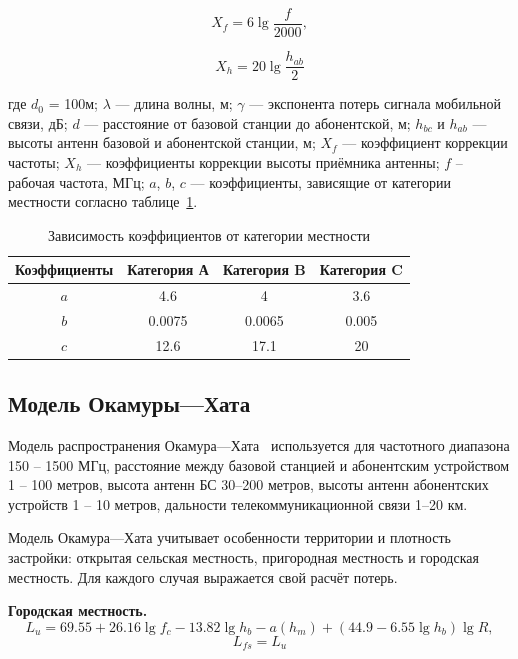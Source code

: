 \begin{equation}
	X_f = 6\lg\frac{f}{2000},
\end{equation}

\begin{equation}
	X_h = 20\lg\frac{h_{ab}}{2}
\end{equation}

где $d_0$ = 100м; $\lambda$ --- длина волны, м; $\gamma$ --- экспонента потерь сигнала мобильной связи, дБ; $d$ --- расстояние от базовой станции до абонентской, м; $h_{bc}$ и $h_{ab}$ --- высоты антенн базовой и абонентской станции, м; $X_f$ --- коэффициент коррекции частоты; $X_h$ --- коэффициенты коррекции высоты приёмника антенны; $f$ – рабочая частота, МГц; $a$, $b$, $c$ --- коэффициенты, зависящие от категории местности согласно таблице~\ref{tbl:place}.

\begin{table}[H]
	\centering
	\begin{threeparttable}
		\caption{\label{tbl:place}Зависимость коэффициентов от 
			категории местности}
		\begin{tabular}{|c|c|c|c|}
			\hline
			Коэффициенты & Категория А & Категория B &Категория C\\\hline
			$a$&4.6&4&3.6\\\hline
			$b$& 0.0075&0.0065&0.005 \\\hline
			$c$& 12.6&17.1&20\\\hline
		\end{tabular}	
	\end{threeparttable}
\end{table}

\subsection{Модель Окамуры---Хата}

Модель распространения Окамура---Хата~\cite{hata} используется для частотного диапазона 150 -- 1500 МГц, расстояние между базовой станцией и абонентским устройством 1 -- 100 метров, высота антенн БС 30--200 метров, высоты антенн абонентских устройств 1 -- 10 метров, дальности телекоммуникационной связи 1--20 км.

Модель Окамура---Хата учитывает особенности территории и плотность застройки: открытая сельская местность, пригородная местность и городская местность. Для каждого случая выражается свой расчёт потерь.

\textbf{Городская местность.}
\begin{equation}
	L_u = 69.55 + 26.16\lg f_c - 13.82 \lg h_b - a(h_m)	+ (44.9 - 6.55 \lg h_b) \lg R,
\end{equation}
\vspace{-8mm}
\begin{equation}
	L_{fs} = L_u
\end{equation}

